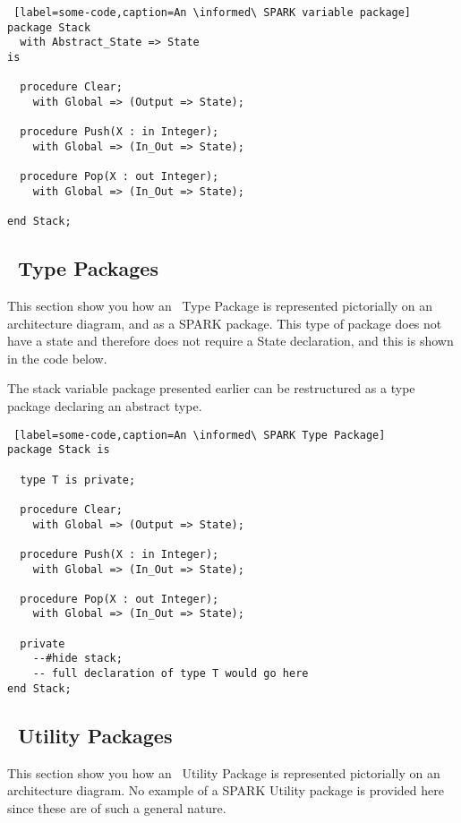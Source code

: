 \begin{lstlisting} [label=some-code,caption=An \informed\ SPARK variable package]
package Stack
  with Abstract_State => State
is

  procedure Clear;
    with Global => (Output => State);

  procedure Push(X : in Integer);
    with Global => (In_Out => State);

  procedure Pop(X : out Integer);
    with Global => (In_Out => State);

end Stack;
\end{lstlisting}


\subsection{\informed\ Type Packages}

\noindent\parbox[][][t]{.2\linewidth}{
    }%
 \parbox[][][t]{.8\linewidth}{

This section show you how an \informed\ Type Package is represented pictorially on an architecture
diagram, and as a SPARK package. This type of package does not have a state and therefore does not
require a State declaration, and this is shown in the code below.
}

The stack variable package presented earlier can be restructured as a type package declaring an
abstract type.

\begin{lstlisting} [label=some-code,caption=An \informed\ SPARK Type Package]
package Stack is

  type T is private;

  procedure Clear;
    with Global => (Output => State);

  procedure Push(X : in Integer);
    with Global => (In_Out => State);

  procedure Pop(X : out Integer);
    with Global => (In_Out => State);

  private
    --#hide stack;
    -- full declaration of type T would go here
end Stack;
\end{lstlisting}


\subsection{\informed\ Utility Packages}
\noindent\parbox[][][t]{.2\linewidth}{
    }%
 \parbox[][][t]{.8\linewidth}{

This section show you how an \informed\ Utility Package is represented pictorially on an architecture
diagram. No example of a SPARK Utility package is provided here since these are of such a general nature.
}

